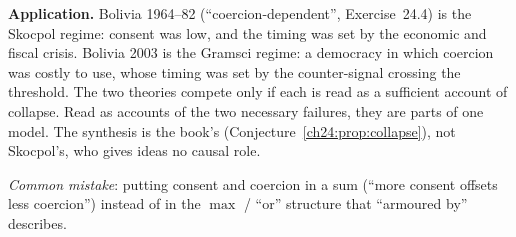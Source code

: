 \documentclass[../solutions_manual.tex]{subfiles}
\begin{document}
 \textbf{Application.} Bolivia 1964--82 (``coercion-dependent'', Exercise~24.4) is the Skocpol regime: consent was low, and the timing was set by the economic and fiscal crisis. Bolivia 2003 is the Gramsci regime: a democracy in which coercion was costly to use, whose timing was set by the counter-signal crossing the threshold. The two theories compete only if each is read as a sufficient account of collapse. Read as accounts of the two necessary failures, they are parts of one model. The synthesis is the book's (Conjecture~\ref{ch24:prop:collapse}), not Skocpol's, who gives ideas no causal role.

\emph{Common mistake}: putting consent and coercion in a sum (``more consent offsets less coercion'') instead of in the $\max$ / ``or'' structure that ``armoured by'' describes.

\endgroup
\end{document}
